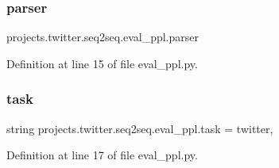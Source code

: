 \subsubsection{\texorpdfstring{parser}{parser}}
{\footnotesize\ttfamily projects.\+twitter.\+seq2seq.\+eval\+\_\+ppl.\+parser}



Definition at line 15 of file eval\+\_\+ppl.\+py.

\mbox{\label{namespaceprojects_1_1twitter_1_1seq2seq_1_1eval__ppl_a0bf742f6d4a475b47c889b9e98b06614}} 
\subsubsection{\texorpdfstring{task}{task}}
{\footnotesize\ttfamily string projects.\+twitter.\+seq2seq.\+eval\+\_\+ppl.\+task = \textquotesingle{}twitter\textquotesingle{},}



Definition at line 17 of file eval\+\_\+ppl.\+py.

